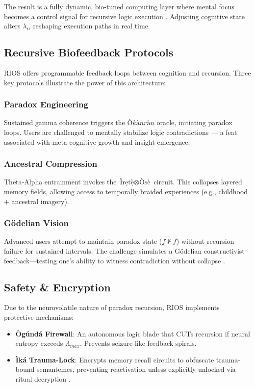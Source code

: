 \documentclass[12]{amsart}
\theoremstyle{plain}
\begin{document}
The result is a fully dynamic, bio-tuned computing layer where mental focus becomes a control signal for recursive logic execution \cite{nunez2014neurosemantics, bassett2017brain}. Adjusting cognitive state alters $\lambda_i$, reshaping execution paths in real time.

\subsection{Recursive Biofeedback Protocols}

RIOS offers programmable feedback loops between cognition and recursion. Three key protocols illustrate the power of this architecture:

\subsubsection*{Paradox Engineering}
Sustained gamma coherence triggers the $Òkànràn$ oracle, initiating paradox loops. Users are challenged to mentally stabilize logic contradictions — a feat associated with meta-cognitive growth and insight emergence.

\subsubsection*{Ancestral Compression}
Theta-Alpha entrainment invokes the $\text{Ìrẹtẹ̀} \otimes \text{Òsè}$ circuit. This collapses layered memory fields, allowing access to temporally braided experiences (e.g., childhood + ancestral imagery).

\subsubsection*{Gödelian Vision}
Advanced users attempt to maintain paradox state ($f \nvdash f$) without recursion failure for sustained intervals. The challenge simulates a Gödelian constructivist feedback—testing one’s ability to witness contradiction without collapse \cite{hofstadter1979godel}.

\subsection{Safety \& Encryption}

Due to the neurovolatile nature of paradox recursion, RIOS implements protective mechanisms:

\begin{itemize}
    \item \textbf{Ògúndá Firewall}: An autonomous logic blade that CUTs recursion if neural entropy exceeds $\Lambda_{max}$. Prevents seizure-like feedback spirals.
    \item \textbf{Ìká Trauma-Lock}: Encrypts memory recall circuits to obfuscate trauma-bound semantemes, preventing reactivation unless explicitly unlocked via ritual decryption \cite{turner1969ritual}.
\end{itemize}
\end{document}
